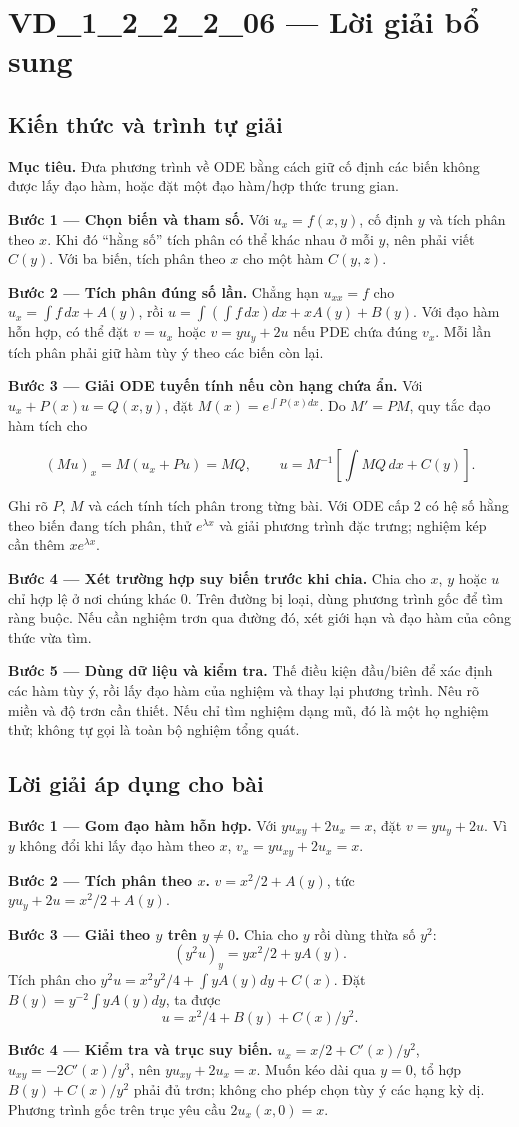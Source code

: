 \documentclass[10pt,a4paper]{article}
\begin{document}
\section*{VD\_1\_2\_2\_2\_06 — Lời giải bổ sung}
\subsection*{Kiến thức và trình tự giải}
\textbf{Mục tiêu.} Đưa phương trình về ODE bằng cách giữ cố định các biến không được lấy đạo hàm, hoặc đặt một đạo hàm/hợp thức trung gian.

\textbf{Bước 1 — Chọn biến và tham số.} Với $u_x=f(x,y)$, cố định $y$ và tích phân theo $x$. Khi đó “hằng số” tích phân có thể khác nhau ở mỗi $y$, nên phải viết $C(y)$. Với ba biến, tích phân theo $x$ cho một hàm $C(y,z)$.

\textbf{Bước 2 — Tích phân đúng số lần.} Chẳng hạn $u_{xx}=f$ cho $u_x=\int f\,dx+A(y)$, rồi $u=\int(\int f\,dx)dx+xA(y)+B(y)$. Với đạo hàm hỗn hợp, có thể đặt $v=u_x$ hoặc $v=yu_y+2u$ nếu PDE chứa đúng $v_x$. Mỗi lần tích phân phải giữ hàm tùy ý theo các biến còn lại.

\textbf{Bước 3 — Giải ODE tuyến tính nếu còn hạng chứa ẩn.} Với $u_x+P(x)u=Q(x,y)$, đặt $M(x)=e^{\int P(x)dx}$. Do $M'=PM$, quy tắc đạo hàm tích cho

\[
(Mu)_x=M(u_x+Pu)=MQ,\qquad
u=M^{-1}\left[\int MQ\,dx+C(y)\right].
\]

Ghi rõ $P$, $M$ và cách tính tích phân trong từng bài. Với ODE cấp 2 có hệ số hằng theo biến đang tích phân, thử $e^{\lambda x}$ và giải phương trình đặc trưng; nghiệm kép cần thêm $xe^{\lambda x}$.

\textbf{Bước 4 — Xét trường hợp suy biến trước khi chia.} Chia cho $x$, $y$ hoặc $u$ chỉ hợp lệ ở nơi chúng khác 0. Trên đường bị loại, dùng phương trình gốc để tìm ràng buộc. Nếu cần nghiệm trơn qua đường đó, xét giới hạn và đạo hàm của công thức vừa tìm.

\textbf{Bước 5 — Dùng dữ liệu và kiểm tra.} Thế điều kiện đầu/biên để xác định các hàm tùy ý, rồi lấy đạo hàm của nghiệm và thay lại phương trình. Nêu rõ miền và độ trơn cần thiết. Nếu chỉ tìm nghiệm dạng mũ, đó là một họ nghiệm thử; không tự gọi là toàn bộ nghiệm tổng quát.
\subsection*{Lời giải áp dụng cho bài}
\textbf{Bước 1 — Gom đạo hàm hỗn hợp.} Với $yu_{xy}+2u_x=x$, đặt $v=yu_y+2u$. Vì $y$ không đổi khi lấy đạo hàm theo $x$, $v_x=yu_{xy}+2u_x=x$.

\textbf{Bước 2 — Tích phân theo $x$.} $v=x^2/2+A(y)$, tức $yu_y+2u=x^2/2+A(y)$.

\textbf{Bước 3 — Giải theo $y$ trên $y\ne0$.} Chia cho $y$ rồi dùng thừa số $y^2$:
\[(y^2u)_y=yx^2/2+yA(y).\]
Tích phân cho $y^2u=x^2y^2/4+\int yA(y)dy+C(x)$. Đặt $B(y)=y^{-2}\int yA(y)dy$, ta được
\[u=x^2/4+B(y)+C(x)/y^2.\]

\textbf{Bước 4 — Kiểm tra và trục suy biến.} $u_x=x/2+C'(x)/y^2$, $u_{xy}=-2C'(x)/y^3$, nên $yu_{xy}+2u_x=x$. Muốn kéo dài qua $y=0$, tổ hợp $B(y)+C(x)/y^2$ phải đủ trơn; không cho phép chọn tùy ý các hạng kỳ dị. Phương trình gốc trên trục yêu cầu $2u_x(x,0)=x$.
\end{document}
